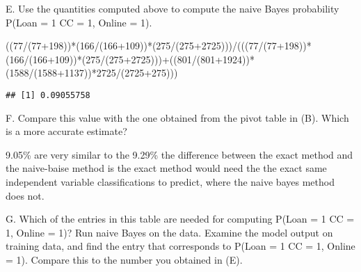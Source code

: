 \documentclass[
]{article}
\newenvironment{Shaded}{\begin{snugshade}}{\end{snugshade}}
\newcommand{\DecValTok}[1]{\textcolor[rgb]{0.00,0.00,0.81}{#1}}
\newcommand{\NormalTok}[1]{#1}
\newcommand{\SpecialCharTok}[1]{\textcolor[rgb]{0.00,0.00,0.00}{#1}}
\begin{document}
E. Use the quantities computed above to compute the naive Bayes
probability P(Loan = 1 \textbar{} CC = 1, Online = 1).

\begin{Shaded}
\begin{Highlighting}[]
\NormalTok{((}\DecValTok{77}\SpecialCharTok{/}\NormalTok{(}\DecValTok{77}\SpecialCharTok{+}\DecValTok{198}\NormalTok{))}\SpecialCharTok{*}\NormalTok{(}\DecValTok{166}\SpecialCharTok{/}\NormalTok{(}\DecValTok{166}\SpecialCharTok{+}\DecValTok{109}\NormalTok{))}\SpecialCharTok{*}\NormalTok{(}\DecValTok{275}\SpecialCharTok{/}\NormalTok{(}\DecValTok{275}\SpecialCharTok{+}\DecValTok{2725}\NormalTok{)))}\SpecialCharTok{/}\NormalTok{(((}\DecValTok{77}\SpecialCharTok{/}\NormalTok{(}\DecValTok{77}\SpecialCharTok{+}\DecValTok{198}\NormalTok{))}\SpecialCharTok{*}\NormalTok{(}\DecValTok{166}\SpecialCharTok{/}\NormalTok{(}\DecValTok{166}\SpecialCharTok{+}\DecValTok{109}\NormalTok{))}\SpecialCharTok{*}\NormalTok{(}\DecValTok{275}\SpecialCharTok{/}\NormalTok{(}\DecValTok{275}\SpecialCharTok{+}\DecValTok{2725}\NormalTok{)))}\SpecialCharTok{+}\NormalTok{((}\DecValTok{801}\SpecialCharTok{/}\NormalTok{(}\DecValTok{801}\SpecialCharTok{+}\DecValTok{1924}\NormalTok{))}\SpecialCharTok{*}\NormalTok{(}\DecValTok{1588}\SpecialCharTok{/}\NormalTok{(}\DecValTok{1588}\SpecialCharTok{+}\DecValTok{1137}\NormalTok{))}\SpecialCharTok{*}\DecValTok{2725}\SpecialCharTok{/}\NormalTok{(}\DecValTok{2725}\SpecialCharTok{+}\DecValTok{275}\NormalTok{)))}
\end{Highlighting}
\end{Shaded}

\begin{verbatim}
## [1] 0.09055758
\end{verbatim}

F. Compare this value with the one obtained from the pivot table in (B).
Which is a more accurate estimate?

9.05\% are very similar to the 9.29\% the difference between the exact
method and the naive-baise method is the exact method would need the the
exact same independent variable classifications to predict, where the
naive bayes method does not.

G. Which of the entries in this table are needed for computing P(Loan =
1 \textbar{} CC = 1, Online = 1)? Run naive Bayes on the data. Examine
the model output on training data, and find the entry that corresponds
to P(Loan = 1 \textbar{} CC = 1, Online = 1). Compare this to the number
you obtained in (E).
\end{document}
